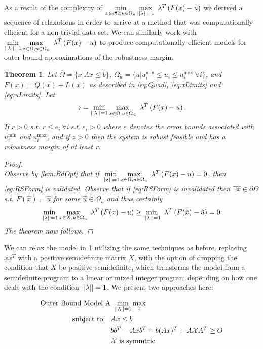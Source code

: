 \documentclass[11pt]{article}
\theoremstyle{plain}
\newtheorem{thm}{Theorem}[section]
\theoremstyle{definition}
\theoremstyle{remark}
\begin{document}
As a result of the complexity of $\min\limits_{x\in \partial \Omega, u\in\Omega_u}\max\limits_{||\bold{\lambda}||=1}\ \bold{\lambda}^T\left(F(x)-u\right)$ we derived a sequence of relaxations in order to arrive at a method that was computationally efficient for a non-trivial data set. We can similarly work with $\min\limits_{||\bold{\lambda}||=1}\max\limits_{x\in \bar{\Omega}, u\in\Omega_u}\ \bold{\lambda}^T\left(F(x)-u\right)$ to produce computationally efficient models for outer bound approximations of the robustness margin. \\
\begin{thm}\label{thm:OPTfeasOut} 
Let $\bar{\Omega}=\{x| Ax\leq b\}$, $\Omega_{u}=\{u| u^{\min}_i\leq u_i \leq u^{\max}_i \ \forall i \}$, and $F(x)=Q(x)+L(x)$ as described in \eqref{eq:Quad}, \eqref{eq:xLimits} and \eqref{eq:uLimits}. Let
$$z = \min\limits_{||\bold{\lambda}||=1}\max\limits_{x\in \bar{\Omega}, u\in\Omega_u}\ \bold{\lambda}^T\left(F(x)-u\right).$$
If $r>0$ s.t. $r\leq e_i \ \forall i \ s.t. \ e_i>0$ where $e$ denotes the error bounds associated with $ u^{\min}_i$ and $ u^{\max}_i$, and if $z>0$ then the system is robust feasible and has a robustness margin of at least r.

\begin{proof} \ \\
Observe by \cref{lem:BdOpt} that if $\min\limits_{||\bold{\lambda}||=1}\max\limits_{x\in \Omega, u\in\Omega_u}\ \bold{\lambda}^T\left(F(x)-u\right)=0$, then \eqref{eq:RSForm} is validated. Observe that if \eqref{eq:RSForm} is invalidated then $\exists \hat{x}\in\partial\Omega$ s.t. $F(\hat{x})=\hat{u}$ for some $\hat{u}\in\Omega_{u}$ and thus certainly $$\min\limits_{||\bold{\lambda}||=1}\max\limits_{x\in X, u\in\Omega_u}\ \bold{\lambda}^T\left(F(x)-u\right) \geq \min\limits_{||\bold{\lambda}||=1}\ \bold{\lambda}^T\left(F(\hat{x})-\hat{u}\right)=0.$$ The theorem now follows.
\end{proof}
\end{thm}

We can relax the model in \cref{thm:OPTfeasOut} utilizing the same techniques as before, replacing $xx^T$ with a positive semidefinite matrix $X$, with the option of dropping the condition that $X$ be positive semidefinite, which transforms the model from a semidefinite program to a linear or mixed integer program depending on how one deals with the condition $||\bold{\lambda}||=1$. We present two approaches here:

\begin{subequations}\label{eq:OPTfeasOutRelaxa}
\begin{align}
\text{Outer Bound Model A}& \ \min\limits_{||\bold{\lambda}||=1}\max\limits_{x}  \\
 \text{subject to: } \ & Ax\leq b \\
 	&bb^T-Axb^T-b(Ax)^T+A\mathcal{X}A^T\geq O \\
 	&\mathcal{X} \text{ is symmtric}
\end{align}
\end{subequations}
\end{document}
